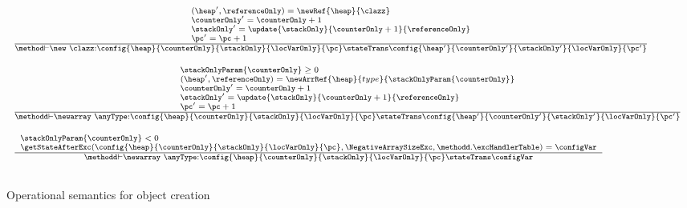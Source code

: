 
\begin{figure}[ht!] 
\begin{frameit}
 $$ \begin{array}{l}

{\scriptsize \frac{\begin{array}{l}
			(\heap',\referenceOnly) = \newRef{\heap}{\clazz} \\ 
			\counterOnly' = \counterOnly + 1\\
			\stackOnly' = \update{\stackOnly}{\counterOnly +  1}{ \referenceOnly  } \\
			\pc' = \pc + 1
	          \end{array}}
              {\method \vdash \new \ \clazz :  \config{\heap}{\counterOnly}{\stackOnly}{\locVarOnly}{\pc} 
		               \stateTrans  
			       \config{\heap'}
			              {\counterOnly'}
				      {\stackOnly' }
				      {\locVarOnly}
				      {\pc'}  } } \\ \\ 


{\scriptsize \frac{\begin{array}{l}
		               \stackOnlyParam{\counterOnly} \geq 0  \\
			                    (\heap',\referenceOnly ) = \newArrRef{\heap}{type}{\stackOnlyParam{\counterOnly}}\\
					    \counterOnly' = \counterOnly + 1\\
					    \stackOnly' = \update{\stackOnly}{\counterOnly +  1}{\referenceOnly } \\
					    \pc' = \pc + 1
			       \end{array}  }
                {\methodd \vdash  \newarray \ \anyType :  \config{\heap}{\counterOnly}{\stackOnly}{\locVarOnly}{\pc} 
		               \stateTrans  
			       \config{\heap'}
			              {\counterOnly'}
				      {\stackOnly' }
				      {\locVarOnly}
				      {\pc'}  } } \\ \\
{\scriptsize \frac{\begin{array}{l}
		               \stackOnlyParam{\counterOnly} < 0 \\
			       \getStateAfterExc( \config{\heap}{\counterOnly}{\stackOnly}{\locVarOnly}{\pc}, \NegativeArraySizeExc,\methodd.\excHandlerTable ) =  \configVar                	        \end{array}  }
                {\methodd \vdash  \newarray \ \anyType :  \config{\heap}{\counterOnly}{\stackOnly}{\locVarOnly}{\pc} 
			                      \stateTrans  
					      \configVar } } \\ \\
\end{array}$$
\caption{\sc Operational semantics for object creation }
\label{opSem:obj:creat}
\end{frameit}
\end{figure}

